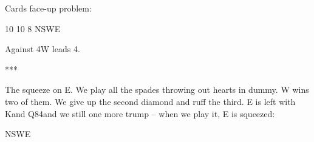 \documentclass[12pt, a4paper]{article}
\begin{document}
Cards face-up problem:

        {}{10}
        {}{10}
        {}{8}
        {NSWE}


Against 4\spades W leads 4\diams.
\begin{center}
    ***
\end{center}

The \twosuit{\clubs}{\diams} squeeze on E.
We play all the spades throwing out hearts in dummy.
W wins two of them. We give up the
second diamond and ruff the third. E is left
with K\diams and Q84\clubs and we still one
more trump -- when we play it, E is squeezed:

        {}{}
        {}{}
        {}{}
        {NSWE}
\end{document}
